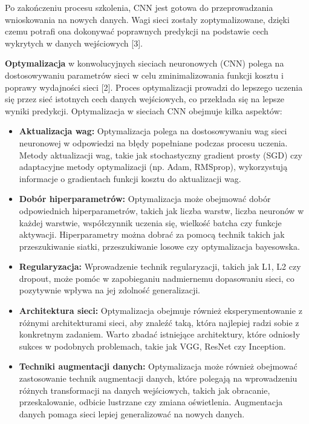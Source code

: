 Po zakończeniu procesu szkolenia, CNN jest gotowa do przeprowadzania wnioskowania na nowych danych. Wagi sieci zostały zoptymalizowane, dzięki czemu potrafi ona dokonywać poprawnych predykcji na podstawie cech wykrytych w danych wejściowych [3].

\textbf{Optymalizacja} w konwolucyjnych sieciach neuronowych (CNN) polega na dostosowywaniu parametrów sieci w celu zminimalizowania funkcji kosztu i poprawy wydajności sieci [2]. Proces optymalizacji prowadzi do lepszego uczenia się przez sieć istotnych cech danych wejściowych, co przekłada się na lepsze wyniki predykcji.
Optymalizacja w sieciach CNN obejmuje kilka aspektów:
\begin{itemize}
    \item \textbf{Aktualizacja wag:} Optymalizacja polega na dostosowywaniu wag sieci neuronowej w odpowiedzi na błędy popełniane podczas procesu uczenia. Metody aktualizacji wag, takie jak stochastyczny gradient prosty (SGD) czy adaptacyjne metody optymalizacji (np. Adam, RMSprop), wykorzystują informacje o gradientach funkcji kosztu do aktualizacji wag.
    \item \textbf{Dobór hiperparametrów:} Optymalizacja może obejmować dobór odpowiednich hiperparametrów, takich jak liczba warstw, liczba neuronów w każdej warstwie, współczynnik uczenia się, wielkość batcha czy funkcje aktywacji. Hiperparametry można dobrać za pomocą technik takich jak przeszukiwanie siatki, przeszukiwanie losowe czy optymalizacja bayesowska.
    \item \textbf{Regularyzacja:} Wprowadzenie technik regularyzacji, takich jak L1, L2 czy dropout, może pomóc w zapobieganiu nadmiernemu dopasowaniu sieci, co pozytywnie wpływa na jej zdolność generalizacji.
    \item \textbf{Architektura sieci:} Optymalizacja obejmuje również eksperymentowanie z różnymi architekturami sieci, aby znaleźć taką, która najlepiej radzi sobie z konkretnym zadaniem. Warto zbadać istniejące architektury, które odniosły sukces w podobnych problemach, takie jak VGG, ResNet czy Inception.
    \item \textbf{Techniki augmentacji danych:} Optymalizacja może również obejmować zastosowanie technik augmentacji danych, które polegają na wprowadzeniu różnych transformacji na danych wejściowych, takich jak obracanie, przeskalowanie, odbicie lustrzane czy zmiana oświetlenia. Augmentacja danych pomaga sieci lepiej generalizować na nowych danych.
\end{itemize}

